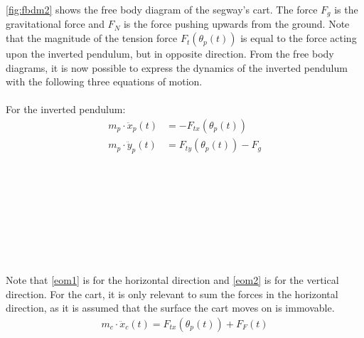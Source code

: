 \autoref{fig:fbdm2} shows the free body diagram of the segway's cart. The force $F_g$ is the gravitational force and $F_N$ is the force pushing upwards from the ground. Note that the magnitude of the tension force $F_t(\theta_p(t))$ is equal to the force acting upon the inverted pendulum, but in opposite direction. %
From the free body diagrams, it is now possible to express the dynamics of the inverted pendulum with the following three equations of motion. \\\\
For the inverted pendulum:
\begin{align}
m_p \cdot \ddot x_p(t) &= - F_{tx}(\theta_p(t)) \label{eom1}\\
m_p \cdot \ddot y_p(t) &= F_{ty}(\theta_p(t)) - F_g \label{eom2}
\end{align}
\begin{where}
\\
\\
\\
\\
\\
\\
\\
\end{where} 

Note that \autoref{eom1} is for the horizontal direction and \autoref{eom2} is for the vertical direction. For the cart, it is only relevant to sum the forces in the horizontal direction, as it is assumed that the surface the cart moves on is immovable. 
\begin{align}
m_c \cdot \ddot x_c(t) = F_{tx}(\theta_p(t))+ F_{F}(t)\label{eom3}
\end{align}
\begin{where}
\\
\\
\\
\end{where}

